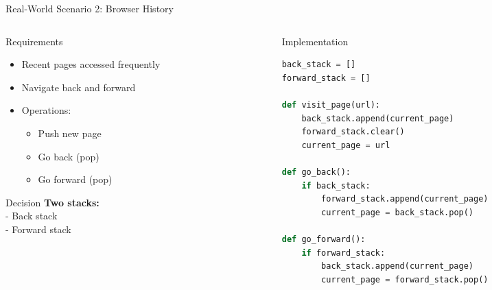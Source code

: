 \documentclass[aspectratio=169,xcolor=dvipsnames]{beamer}
\begin{document}
\begin{frame}[fragile]{Real-World Scenario 2: Browser History}
  \begin{columns}
    \begin{column}{0.48\textwidth}
      \begin{block}{Requirements}
        \begin{itemize}
          \item Recent pages accessed frequently
          \item Navigate back and forward
          \item Operations:
            \begin{itemize}
              \item Push new page
              \item Go back (pop)
              \item Go forward (pop)
            \end{itemize}
        \end{itemize}
      \end{block}

      \vspace{0.3cm}

      \begin{alertblock}{Decision}
        \textbf{Two stacks:} \\
        - Back stack \\
        - Forward stack
      \end{alertblock}
    \end{column}
    \begin{column}{0.48\textwidth}
      \begin{exampleblock}{Implementation}
        \begin{lstlisting}[language=Python,basicstyle=\tiny\ttfamily]
back_stack = []
forward_stack = []

def visit_page(url):
    back_stack.append(current_page)
    forward_stack.clear()
    current_page = url

def go_back():
    if back_stack:
        forward_stack.append(current_page)
        current_page = back_stack.pop()

def go_forward():
    if forward_stack:
        back_stack.append(current_page)
        current_page = forward_stack.pop()
        \end{lstlisting}
      \end{exampleblock}
    \end{column}
  \end{columns}
\end{frame}
\end{document}
